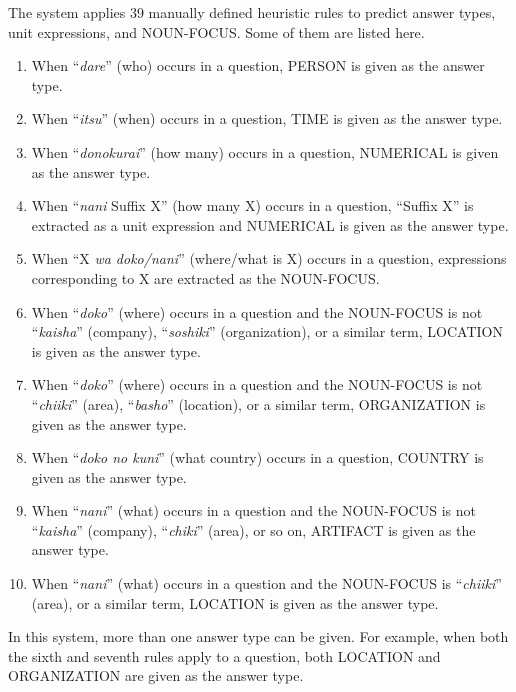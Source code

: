 The system applies 39 manually 
defined heuristic rules to predict 
answer types, unit expressions, and NOUN-FOCUS. 
Some of them are listed here.
\begin{enumerate}
\item 
When ``{\it dare}'' (who) occurs in a question, PERSON is given as the answer type. 

\item 
When ``{\it itsu}'' (when) occurs in a question, TIME is given as the answer type. 

\item 
When ``{\it donokurai}'' (how many) occurs in a question, NUMERICAL is given as the answer type. 

\item 
When ``{\it nani} Suffix X'' (how many X) occurs in a question, ``Suffix X'' is extracted as a unit expression 
and NUMERICAL is given as the answer type. 

\item 
When ``X {\it wa doko/nani}'' (where/what is X) occurs in a question, expressions 
corresponding to X are extracted as the NOUN-FOCUS. 

\item 
When ``{\it doko}'' (where) occurs in a question and the NOUN-FOCUS is not ``{\it kaisha}'' (company), ``{\it soshiki}'' (organization), 
or a similar term, LOCATION is given as the answer type. 

\item 
When ``{\it doko}'' (where) occurs in a question and the NOUN-FOCUS is not ``{\it chiiki}'' (area), ``{\it basho}'' (location), 
or a similar term, ORGANIZATION is given as the answer type. 

\item 
When ``{\it doko no kuni}'' (what country) occurs in a question, COUNTRY is given as the answer type. 

\item 
When ``{\it nani}'' (what) occurs in a question and the NOUN-FOCUS is not ``{\it kaisha}'' (company), ``{\it chiki}'' (area), or so on, ARTIFACT is given as the answer type. 

\item 
When ``{\it nani}'' (what) occurs in a question and the NOUN-FOCUS is ``{\it chiiki}'' (area), or a similar term, LOCATION is given as the answer type. 

\end{enumerate}

In this system, 
more than one answer type can be given. 
For example, 
when both the sixth and seventh rules apply to a question, 
both LOCATION and ORGANIZATION are given as the answer type. 

